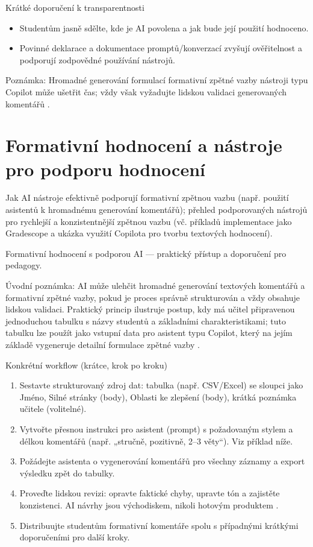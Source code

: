 \documentclass{report}%
\begin{document}
Krátké doporučení k transparentnosti
\begin{itemize}
  \item Studentům jasně sdělte, kde je AI povolena a jak bude její použití hodnoceno.
  \item Povinné deklarace a dokumentace promptů/konverzací zvyšují ověřitelnost a podporují zodpovědné používání nástrojů.
\end{itemize}

Poznámka: Hromadné generování formulací formativní zpětné vazby nástroji typu Copilot může ušetřit čas; vždy však vyžadujte lidskou validaci generovaných komentářů \cite{kb_ai_101_tipu_pdf_04e4a115_page_21_2}.%

%
\section{Formativní hodnocení a nástroje pro podporu hodnocení}%
Jak AI nástroje efektivně podporují formativní zpětnou vazbu (např. použití asistentů k hromadnému generování komentářů); přehled podporovaných nástrojů pro rychlejší a konzistentnější zpětnou vazbu (vč. příkladů implementace jako Gradescope a ukázka využití Copilota pro tvorbu textových hodnocení).%


%
Formativní hodnocení s podporou AI — praktický přístup a doporučení pro pedagogy.

Úvodní poznámka: AI může ulehčit hromadné generování textových komentářů a formativní zpětné vazby, pokud je proces správně strukturován a vždy obsahuje lidskou validaci. Praktický princip ilustruje postup, kdy má učitel připravenou jednoduchou tabulku s názvy studentů a základními charakteristikami; tuto tabulku lze použít jako vstupní data pro asistent typu Copilot, který na jejím základě vygeneruje detailní formulace zpětné vazby \cite{kb_ai_101_tipu_pdf_04e4a115_page_21_2}.

Konkrétní workflow (krátce, krok po kroku)
\begin{enumerate}
  \item Sestavte strukturovaný zdroj dat: tabulka (např. CSV/Excel) se sloupci jako Jméno, Silné stránky (body), Oblasti ke zlepšení (body), krátká poznámka učitele (volitelné).
  \item Vytvořte přesnou instrukci pro asistent (prompt) s požadovaným stylem a délkou komentářů (např. „stručně, pozitivně, 2–3 věty“). Viz příklad níže.
  \item Požádejte asistenta o vygenerování komentářů pro všechny záznamy a export výsledku zpět do tabulky.
  \item Proveďte lidskou revizi: opravte faktické chyby, upravte tón a zajistěte konzistenci. AI návrhy jsou východiskem, nikoli hotovým produktem \cite{kb_ai_101_tipu_pdf_04e4a115_page_21_2}.
  \item Distribuujte studentům formativní komentáře spolu s případnými krátkými doporučeními pro další kroky.
\end{enumerate}
\end{document}
